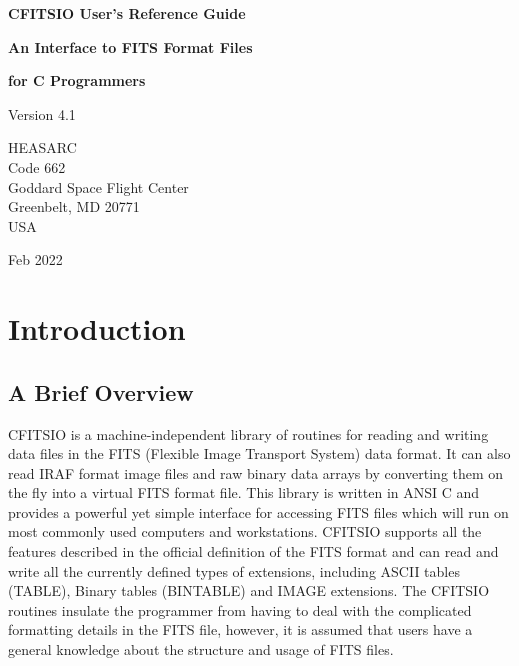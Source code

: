 \documentclass[11pt]{book}
\begin{document}

\begin{titlepage}
\normalsize
\vspace*{4.0cm}
\begin{center}
{\Huge \bf CFITSIO User's Reference Guide}\\
\end{center}
\medskip 
\medskip 
\begin{center}
{\LARGE \bf An Interface to FITS Format Files}\\
\end{center}
\begin{center}
{\LARGE \bf for C Programmers}\\
\end{center}
\medskip
\medskip
\begin{center}
{\Large Version 4.1 \\}
\end{center}
\bigskip
\vskip 2.5cm
\begin{center}
{HEASARC\\
Code 662\\
Goddard Space Flight Center\\
Greenbelt, MD 20771\\
USA}
\end{center}

\vfill
\bigskip
\begin{center}
{\Large Feb 2022\\}
\end{center}
\vfill
\end{titlepage}

\clearpage

\tableofcontents
\chapter{Introduction }


\section{ A Brief Overview}

CFITSIO is a machine-independent library of routines for reading and
writing data files in the FITS (Flexible Image Transport System) data
format.  It can also read IRAF format image files and raw binary data
arrays by converting them on the fly into a virtual FITS format file.
This library is written in ANSI C and provides a powerful yet simple
interface for accessing FITS files which will run on most commonly used
computers and workstations.  CFITSIO supports all the features
described in the official definition of the FITS format and can
read and write all the currently defined types of extensions, including
ASCII tables (TABLE), Binary tables (BINTABLE) and IMAGE extensions.
The CFITSIO routines insulate the programmer from having to deal with
the complicated formatting details in the FITS file, however, it is
assumed that users have a general knowledge about the structure and
usage of FITS files.
\end{document}
